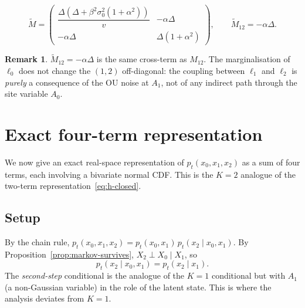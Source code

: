 \documentclass[11pt,a4paper,openany]{book}
\theoremstyle{plainserif}
\theoremstyle{definition}
\theoremstyle{remarkstyle}
\newtheorem*{remark}{Remark}
\begin{document}
\begin{equation}
\boxed{\;
\widetilde M = \begin{pmatrix}
\dfrac{\Delta(\Delta + \beta^2\sigma_0^2(1+\alpha^2))}{v} & -\alpha\Delta \\[6pt]
-\alpha\Delta & \Delta(1+\alpha^2)
\end{pmatrix},\qquad
\widetilde M_{12} = -\alpha\Delta.
\;}
\label{eq:Schur}
\end{equation}

\begin{remark}
$\widetilde M_{12} = -\alpha\Delta$ is the same cross-term as $M_{12}$. The
marginalisation of $\ell_0$ does not change the $(1,2)$ off-diagonal: the
coupling between $\ell_1$ and $\ell_2$ is \emph{purely} a consequence of
the OU noise at $A_1$, not of any indirect path through the site variable
$A_0$.
\end{remark}

\chapter{Exact four-term representation}
\label{ch:K2-four-terms}

We now give an exact real-space representation of $p_t(x_0, x_1, x_2)$ as
a sum of four terms, each involving a bivariate normal CDF. This is the
$K=2$ analogue of the two-term representation~\eqref{eq:h-closed}.

\section{Setup}

By the chain rule, $p_t(x_0,x_1,x_2) = p_t(x_0,x_1)\,p_t(x_2\mid x_0,x_1)$.
By Proposition~\ref{prop:markov-survives}, $X_2 \perp X_0 \mid X_1$, so
\begin{equation}
p_t(x_2\mid x_0,x_1) = p_t(x_2\mid x_1).
\end{equation}
The \emph{second-step} conditional is the analogue of the $K=1$ conditional
but with $A_1$ (a non-Gaussian variable) in the role of the latent state.
This is where the analysis deviates from $K=1$.
\end{document}
